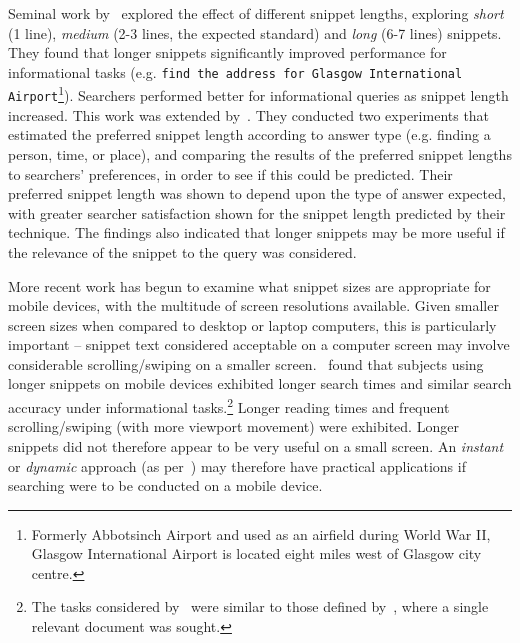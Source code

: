Seminal work by~\cite{cutrell2007eye_tracking} explored the effect of different snippet lengths, exploring \emph{short} (1 line), \emph{medium} (2-3 lines, the expected standard) and \emph{long} (6-7 lines) snippets. They found that longer snippets significantly improved performance for informational tasks (e.g. \texttt{find the address for Glasgow International Airport}\footnote{Formerly Abbotsinch Airport and used as an airfield during World War II, Glasgow International Airport is located eight miles west of Glasgow city centre.}). Searchers performed better for informational queries as snippet length increased. This work was extended by~\cite{kaisser2008improving}. They conducted two experiments that estimated the preferred snippet length according to answer type (e.g. finding a person, time, or place), and comparing the results of the preferred snippet lengths to searchers' preferences, in order to see if this could be predicted. Their preferred snippet length was shown to depend upon the type of answer expected, with greater searcher satisfaction shown for the snippet length predicted by their technique. The findings also indicated that longer snippets may be more useful if the relevance of the snippet to the query was considered.

More recent work has begun to examine what snippet sizes are appropriate for mobile devices, with the multitude of screen resolutions available. Given smaller screen sizes when compared to desktop or laptop computers, this is particularly important -- snippet text considered acceptable on a computer screen may involve considerable scrolling/swiping on a smaller screen.~\cite{kim2017mobile_search_snippets} found that subjects using longer snippets on mobile devices exhibited longer search times and similar search accuracy under informational tasks.\footnote{The tasks considered by~\cite{kim2017mobile_search_snippets} were similar to those defined by~\cite{cutrell2007eye_tracking}, where a single relevant document was sought.} Longer reading times and frequent scrolling/swiping (with more viewport movement) were exhibited. Longer snippets did not therefore appear to be very useful on a small screen. An \emph{instant} or \emph{dynamic} approach (as per~\cite{paek2004wavelens}) may therefore have practical applications if searching were to be conducted on a mobile device.

